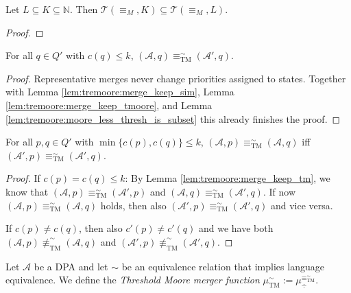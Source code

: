 \begin{lem}
	Let $L \subseteq K \subseteq \mathbb{N}$. Then $\mathcal{T}(\equiv_M, K) \subseteq \mathcal{T}(\equiv_M, L)$.
	\label{lem:tremoore:moore_less_thresh_is_subset}
\end{lem}

\begin{proof}
\end{proof}

\begin{lem}
	For all $q \in Q'$ with $c(q) \leq k$, $(\mathcal{A}, q) \equiv^\sim_\text{TM} (\mathcal{A}', q)$.
	\label{lem:tremoore:merge_keep_tm}
\end{lem}

\begin{proof}
	Representative merges never change priorities assigned to states. Together with Lemma \ref{lem:tremoore:merge_keep_sim}, Lemma \ref{lem:tremoore:merge_keep_tmoore}, and Lemma \ref{lem:tremoore:moore_less_thresh_is_subset} this already finishes the proof.
\end{proof}

\begin{lem}
	For all $p, q \in Q'$ with $\min \{c(p), c(q)\} \leq k$, $(\mathcal{A}, p) \equiv^\sim_\text{TM} (\mathcal{A}, q)$ iff \linebreak $(\mathcal{A}', p) \equiv^\sim_\text{TM} (\mathcal{A}', q)$.
	\label{lem:tremoore:merge_changes_only_higher}
\end{lem}

\begin{proof}
	If $c(p) = c(q) \leq k$: By Lemma \ref{lem:tremoore:merge_keep_tm}, we know that $(\mathcal{A}, p) \equiv^\sim_\text{TM} (\mathcal{A}', p)$ and $(\mathcal{A}, q) \equiv^\sim_\text{TM} (\mathcal{A}', q)$. If now $(\mathcal{A}, p) \equiv^\sim_\text{TM} (\mathcal{A}, q)$ holds, then also $(\mathcal{A}', p) \equiv^\sim_\text{TM} (\mathcal{A}', q)$ and vice versa.
	
	If $c(p) \neq c(q)$, then also $c'(p) \neq c'(q)$ and we have both $(\mathcal{A}, p) \not\equiv^\sim_\text{TM} (\mathcal{A}, q)$ and $(\mathcal{A}', p) \not\equiv^\sim_\text{TM} (\mathcal{A}', q)$.
\end{proof}

\vspace{10pt}

\begin{defn}
	Let $\mathcal{A}$ be a DPA and let $\sim$ be an equivalence relation that implies language equivalence. We define the \emph{Threshold Moore merger function} $\mu_\text{TM}^\sim := \mu_\div^{\equiv^\sim_\text{TM}}$.
\end{defn}

